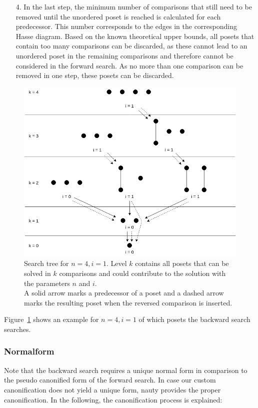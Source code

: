 \documentclass[10pt,journal,compsoc]{IEEEtran}
\begin{document}
\begin{itemize}
  \item[4.]
    In the last step, the minimum number of comparisons that still need to be removed until the unordered poset is reached is calculated for each predecessor.
    This number corresponds to the edges in the corresponding Hasse diagram.
    Based on the known theoretical upper bounds, all posets that contain too many comparisons can be discarded, as these cannot lead to an unordered poset in the remaining comparisons and therefore cannot be considered in the forward search.
    As no more than one comparison can be removed in one step, these posets can be discarded.
\end{itemize}

\begin{figure}[!b]
  \centering
  \includegraphics[width=\columnwidth]{figures/backward-search-tree.png}
  \caption{Search tree for $n = 4, i = 1$.
    Level $k$ contains all posets that can be solved in $k$ comparisons and could contribute to the solution with the parameters $n$ and $i$. \\
    A solid arrow marks a predecessor of a poset and a dashed arrow marks the resulting poset when the reversed comparison is inserted.}
  \label{fig:backward-search-tree}
\end{figure}

Figure~\ref{fig:backward-search-tree} shows an example for $n = 4, i = 1$ of which posets the backward search searches.

\subsubsection{Normalform} \label{sec:backward:normal_form}
Note that the backward search requires a unique normal form in comparison to the pseudo canonified form of the forward search.
In case our custom canonification does not yield a unique form, nauty provides the proper canonification.
In the following, the canonification process is explained:
\end{document}
